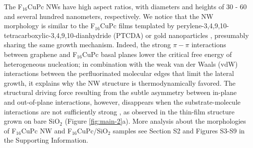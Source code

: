 The F\(_{\text{16}}\)CuPc NWs have high aspect ratios, with diameters and heights
of 30 - 60 and several hundred nanometers, respectively. We notice that
the NW morphology is similar to the F\(_{\text{16}}\)CuPc films templated by
perylene-3,4,9,10-tetracarboxylic-3,4,9,10-dianhydride (PTCDA)
\cite{Yang_2009_F16_PTCDA} or gold nanoparticles
\cite{Mbenkum_2006_F16_1D}, presumably sharing the same growth
mechanism. Indeed, the strong \(\pi-\pi\) interactions between graphene
and F\(_{\text{16}}\)CuPc basal planes lower the critical free energy of
heterogeneous nucleation; in combination with the weak van der Waals
(vdW) interactions between the perfluorinated molecular edges that
limit the lateral growth, it explains why the NW structure is
thermodynamically favored. The structural driving force resulting from
the subtle asymmetry between in-plane and out-of-plane interactions,
however, disappears when the substrate-molecule interactions are not
sufficiently strong \cite{Tian_2017}, as observed in the thin-film
structure grown on bare SiO\(_{\text{2}}\) (Figure \ref{fig:main-2}a). More analysis
about the morphologies of F\(_{\text{16}}\)CuPc NW and F\(_{\text{16}}\)CuPc/SiO\(_{\text{2}}\) samples
see Section S2 and Figures S3-S9 in the Supporting Information.

